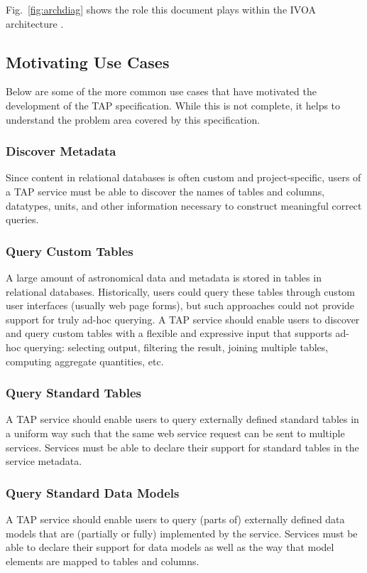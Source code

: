 \documentclass[11pt,a4paper]{ivoa}
\begin{document}
Fig.~\ref{fig:archdiag} shows the role this document plays within the
IVOA architecture \citep{note:VOARCH}.


\subsection{Motivating Use Cases}
Below are some of the more common use cases that have motivated the development 
of the TAP specification. While this is not complete, it helps to understand the 
problem area covered by this specification.

\subsubsection{Discover Metadata}
Since content in relational databases is often custom and project-specific, 
users of a TAP service must be able to discover the names of tables and 
columns, datatypes, units, and other information necessary to construct 
meaningful correct queries.

\subsubsection{Query Custom Tables}
A large amount of astronomical data and metadata is stored in tables in 
relational databases. Historically, users could query these tables through 
custom user interfaces (usually web page forms), but such approaches could not 
provide support for truly ad-hoc querying. A TAP service should enable users to 
discover and query custom tables with a flexible and expressive input that 
supports ad-hoc querying: selecting output, filtering the result, joining 
multiple tables, computing aggregate quantities, etc. 

\subsubsection{Query Standard Tables}
A TAP service should enable users to query externally defined standard tables 
in a uniform way such that the same web service request can be sent to multiple 
services. Services must be able to declare their support for standard tables in 
the service metadata.

\subsubsection{Query Standard Data Models}
A TAP service should enable users to query (parts of) externally defined data 
models that are (partially or fully) implemented by the service. Services must 
be able to declare their support for data models as well as the way that model 
elements are mapped to tables and columns.
\end{document}
